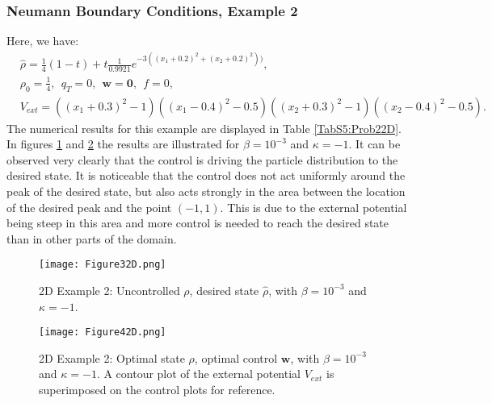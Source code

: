 \subsubsection{Neumann Boundary Conditions, Example 2}	
Here, we have:
\begin{align*}
&\widehat \rho = \frac{1}{4}(1-t) + t\frac{1}{0.9921}e^{-3((x_1+0.2)^2 + (x_2+0.2)^2))},\\
&\rho_0 = \frac{1}{4},\ \
q_{T} = 0,\ \
\mathbf{w} = \mathbf{0},\ \
f =0,\\
&V_{ext} =\left((x_1 + 0.3)^2 - 1\right)\left((x_1-0.4)^2 - 0.5\right)
\left((x_2 + 0.3)^2 - 1\right)\left((x_2-0.4)^2 - 0.5\right).
\end{align*}
The numerical results for this example are displayed in Table \ref{TabS5:Prob22D}. In figures \ref{rhoHat2dEx4} and \ref{rhoOpt2dEx4} the results are illustrated for $\beta = 10^{-3}$ and $\kappa = -1$. It can be observed very clearly that the control is driving the particle distribution to the desired state. It is noticeable that the control does not act uniformly around the peak of the desired state, but also acts strongly in the area between the location of the desired peak and the point $(-1,1)$. This is due to the external potential being steep in this area and more control is needed to reach the desired state than in other parts of the domain.


\begin{figure}[h]
	\texttt{[image: Figure32D.png]}
	\caption{2D Example 2: Uncontrolled $\rho$, desired state $\widehat \rho$,  with $\beta = 10^{-3}$ and $\kappa = -1$. }
	\label{rhoHat2dEx4}
\end{figure}
\begin{figure}[h]
	\texttt{[image: Figure42D.png]}
	\caption{2D Example 2: Optimal state $\rho$, optimal control $\mathbf{w}$, with $\beta = 10^{-3}$ and $\kappa = -1$. A contour plot of the external potential $V_{ext}$ is superimposed on the control plots for reference.} 
	\label{rhoOpt2dEx4}
\end{figure}







